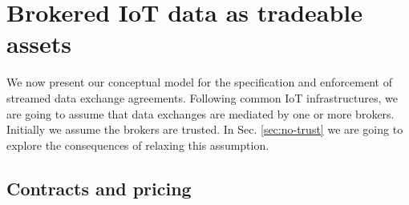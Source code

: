 \documentclass[chi_draft]{sigchi}
\begin{document}





\section{Brokered IoT data as tradeable assets}

We now present our conceptual model for the specification and enforcement of streamed data exchange agreements.
%
Following common IoT infrastructures, we are going to assume that data exchanges are mediated by one or more brokers.
Initially we assume the brokers are trusted. In Sec. \ref{sec:no-trust} we are going to explore the consequences of relaxing this assumption.

\subsection{Contracts and pricing}
\end{document}
